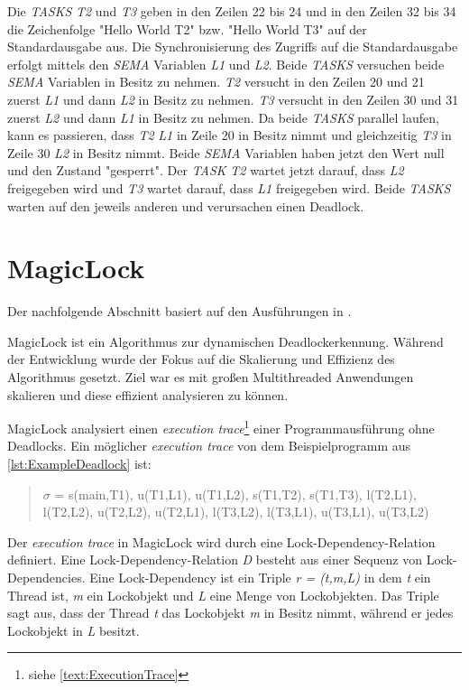 Die \emph{TASKS} \emph{T2} und \emph{T3} geben in den Zeilen 22 bis 24 und in
den Zeilen 32 bis 34 die Zeichenfolge "Hello World T2" bzw. "Hello World T3" auf
der Standardausgabe aus. Die Synchronisierung des Zugriffs auf die
Standardausgabe erfolgt mittels den \emph{SEMA} Variablen \emph{L1} und
\emph{L2}. Beide \emph{TASKS} versuchen beide \emph{SEMA} Variablen in Besitz zu
nehmen. \emph{T2} versucht in den Zeilen 20 und 21 zuerst \emph{L1} und dann
\emph{L2} in Besitz zu nehmen. \emph{T3} versucht in den Zeilen 30 und 31 zuerst
\emph{L2} und dann \emph{L1} in Besitz zu nehmen. Da beide \emph{TASKS} parallel
laufen, kann es passieren, dass \emph{T2} \emph{L1} in Zeile 20 in Besitz nimmt
und gleichzeitig \emph{T3} in Zeile 30 \emph{L2} in Besitz nimmt. Beide
\emph{SEMA} Variablen haben jetzt den Wert null und den Zustand "gesperrt". Der
\emph{TASK} \emph{T2} wartet jetzt darauf, dass \emph{L2} freigegeben wird und
\emph{T3} wartet darauf, dass \emph{L1} freigegeben wird. Beide \emph{TASKS}
warten auf den jeweils anderen und verursachen einen Deadlock.

\section{MagicLock}
\label{section:MagicLock}
Der nachfolgende Abschnitt basiert auf den Ausführungen in \autocite{MagicLock}.

MagicLock ist ein Algorithmus zur dynamischen Deadlockerkennung. Während der
Entwicklung wurde der Fokus auf die Skalierung und Effizienz des Algorithmus
gesetzt. Ziel war es mit großen Multithreaded Anwendungen skalieren und diese
effizient analysieren zu können.

MagicLock analysiert einen \emph{execution trace}\footnote{siehe
\cref{text:ExecutionTrace}} einer Programmausführung ohne Deadlocks. Ein
möglicher \emph{execution trace} von dem Beispielprogramm aus
\cref{lst:ExampleDeadlock} ist:
\begin{quote}
  \textbf{$\sigma$} = s(main,T1), u(T1,L1), u(T1,L2), s(T1,T2), s(T1,T3),
  l(T2,L1), l(T2,L2), u(T2,L2), u(T2,L1), l(T3,L2), l(T3,L1), u(T3,L1), u(T3,L2)
\end{quote}
Der \emph{execution trace} in MagicLock wird durch eine Lock-Dependency-Relation
definiert. Eine Lock-Dependency-Relation \emph{D} besteht aus einer Sequenz von
Lock-Dependencies. Eine Lock-Dependency ist ein Triple \emph{r = (t,m,L)} in dem
\emph{t} ein Thread ist, \emph{m} ein Lockobjekt und \emph{L} eine Menge von
Lockobjekten. Das Triple sagt aus, dass der Thread \emph{t} das Lockobjekt
\emph{m} in Besitz nimmt, während er jedes Lockobjekt in \emph{L} besitzt.


